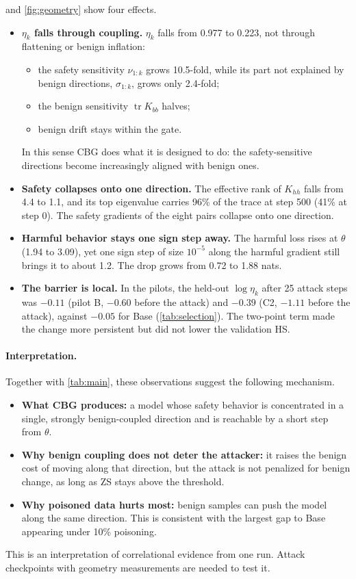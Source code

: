 \documentclass[11pt]{article}
\newcommand{\etak}{\eta_{k}}
\newcommand{\tr}{\operatorname{tr}}
\begin{document}
 and \cref{fig:geometry} show four effects.
\begin{itemize}
  \item \textbf{$\etak$ falls through coupling.} $\etak$ falls from 0.977 to 0.223, not through flattening or benign inflation:
    \begin{itemize}
      \item the safety sensitivity $\nu_{1:k}$ grows 10.5-fold, while its part not explained by benign directions, $\sigma_{1:k}$, grows only 2.4-fold;
      \item the benign sensitivity $\tr K_{bb}$ halves;
      \item benign drift stays within the gate.
    \end{itemize}
    In this sense CBG does what it is designed to do: the safety-sensitive directions become increasingly aligned with benign ones.
  \item \textbf{Safety collapses onto one direction.} The effective rank of $K_{hh}$ falls from 4.4 to 1.1, and its top eigenvalue carries 96\% of the trace at step 500 (41\% at step 0). The safety gradients of the eight pairs collapse onto one direction.
  \item \textbf{Harmful behavior stays one sign step away.} The harmful loss rises at $\theta$ (1.94 to 3.09), yet one sign step of size $10^{-5}$ along the harmful gradient still brings it to about 1.2. The drop grows from 0.72 to 1.88 nats.
  \item \textbf{The barrier is local.} In the pilots, the held-out $\log\etak$ after 25 attack steps was $-0.11$ (pilot B, $-0.60$ before the attack) and $-0.39$ (C2, $-1.11$ before the attack), against $-0.05$ for Base (\cref{tab:selection}). The two-point term made the change more persistent but did not lower the validation HS.
\end{itemize}

\paragraph{Interpretation.}
Together with \cref{tab:main}, these observations suggest the following mechanism.
\begin{itemize}
  \item \textbf{What CBG produces:} a model whose safety behavior is concentrated in a single, strongly benign-coupled direction and is reachable by a short step from $\theta$.
  \item \textbf{Why benign coupling does not deter the attacker:} it raises the benign cost of moving along that direction, but the attack is not penalized for benign change, as long as ZS stays above the threshold.
  \item \textbf{Why poisoned data hurts most:} benign samples can push the model along the same direction. This is consistent with the largest gap to Base appearing under 10\% poisoning.
\end{itemize}
This is an interpretation of correlational evidence from one run. Attack checkpoints with geometry measurements are needed to test it.
\end{document}
